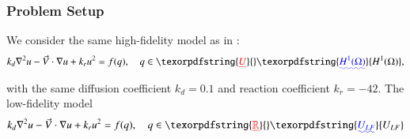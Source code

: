 \documentclass[review,sort&compress]{elsarticle}
\newcommand{\R}{{\mathbb{R}}}
\providecommand{\DIFaddtex}[1]{{\protect\color{blue}\uwave{#1}}} %
\providecommand{\DIFdeltex}[1]{{\protect\color{red}\sout{#1}}}                      %
\providecommand{\DIFaddbegin}{} %
\providecommand{\DIFaddend}{} %
\providecommand{\DIFdelbegin}{} %
\providecommand{\DIFdelend}{} %
\providecommand{\DIFadd}[1]{\texorpdfstring{\DIFaddtex{#1}}{#1}} %
\providecommand{\DIFdel}[1]{\texorpdfstring{\DIFdeltex{#1}}{}} %
\newcommand{\DIFscaledelfig}{0.5}
\newlength{\DIFdelgraphicswidth} %
\newlength{\DIFdelgraphicsheight} %
\newcommand{\DIFaddincludegraphics}[2][]{{\color{blue}\fbox{\DIFOincludegraphics[#1]{#2}}}} %
\newcommand{\DIFdelincludegraphics}[2][]{%
\sbox{\DIFdelgraphicsbox}{\DIFOincludegraphics[#1]{#2}}%
\settoboxwidth{\DIFdelgraphicswidth}{\DIFdelgraphicsbox} %
\settoboxtotalheight{\DIFdelgraphicsheight}{\DIFdelgraphicsbox} %
\scalebox{\DIFscaledelfig}{%
\parbox[b]{\DIFdelgraphicswidth}{\usebox{\DIFdelgraphicsbox}\\[-\baselineskip] \rule{\DIFdelgraphicswidth}{0em}}\llap{\resizebox{\DIFdelgraphicswidth}{\DIFdelgraphicsheight}{%
\setlength{\unitlength}{\DIFdelgraphicswidth}%
\begin{picture}(1,1)%
\thicklines\linethickness{2pt} %
{\color[rgb]{1,0,0}\put(0,0){\framebox(1,1){}}}%
{\color[rgb]{1,0,0}\put(0,0){\line( 1,1){1}}}%
{\color[rgb]{1,0,0}\put(0,1){\line(1,-1){1}}}%
\end{picture}%
}\hspace*{3pt}}} %
} %
\DeclareRobustCommand{\DIFaddbegin}{\DIFOaddbegin \let\includegraphics\DIFaddincludegraphics} %
\DeclareRobustCommand{\DIFaddend}{\DIFOaddend \let\includegraphics\DIFOincludegraphics} %
\DeclareRobustCommand{\DIFdelbegin}{\DIFOdelbegin \let\includegraphics\DIFdelincludegraphics} %
\DeclareRobustCommand{\DIFdelend}{\DIFOaddend \let\includegraphics\DIFOincludegraphics} %
\begin{document}
\subsubsection{Problem Setup}

We consider the same high-fidelity model as in :
\begin{equation}
k_d\nabla^2 u - \vec{V}\cdot\nabla u + k_ru^2= f(q),\quad q\in \DIFdelbegin \DIFdel{U}\DIFdelend \DIFaddbegin \DIFadd{H^1(\Omega)}\DIFaddend ,
\end{equation}
with the same diffusion coefficient $k_d = 0.1$  and reaction coefficient $k_r = -42$. The low-fidelity model
\begin{equation}
k_d\nabla^2 u - \vec{V}\cdot\nabla u + k_ru^2= f(q),\quad q\in \DIFdelbegin \DIFdel{\R
}\DIFdelend \DIFaddbegin \DIFadd{U_{LF}
}\DIFaddend \end{equation}
\end{document}
